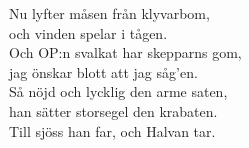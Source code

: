   \begin{vers}
Nu lyfter måsen från klyvarbom, \\
och vinden spelar i tågen. \\
Och OP:n svalkat har skepparns gom, \\
jag önskar blott att jag såg'en. \\
Så nöjd och lycklig den arme saten, \\
han sätter storsegel den krabaten. \\
Till sjöss han far, och Halvan tar. \\
\end{vers}